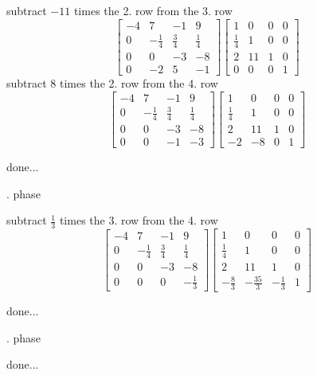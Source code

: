 \documentclass[12pt]{article}
\begin{document}
subtract $-11$ times the 2. row from the 3. row
$$\left[{\begin{array}{cccc}-4& 7& -1& 9\\ 0& -\frac{1}{4}& \frac{3}{4}& \frac{1}{4}\\ 0& 0& -3& -8\\ 0& -2& 5& -1\end{array}}\right]\left[{\begin{array}{cccc}1& 0& 0& 0\\ \frac{1}{4}& 1& 0& 0\\ 2& 11& 1& 0\\ 0& 0& 0& 1\end{array}}\right]$$
subtract $8$ times the 2. row from the 4. row
$$\left[{\begin{array}{cccc}-4& 7& -1& 9\\ 0& -\frac{1}{4}& \frac{3}{4}& \frac{1}{4}\\ 0& 0& -3& -8\\ 0& 0& -1& -3\end{array}}\right]\left[{\begin{array}{cccc}1& 0& 0& 0\\ \frac{1}{4}& 1& 0& 0\\ 2& 11& 1& 0\\ -2& -8& 0& 1\end{array}}\right]$$
\par\noindent done...


\par{}. phase

subtract $\frac{1}{3}$ times the 3. row from the 4. row
$$\left[{\begin{array}{cccc}-4& 7& -1& 9\\ 0& -\frac{1}{4}& \frac{3}{4}& \frac{1}{4}\\ 0& 0& -3& -8\\ 0& 0& 0& -\frac{1}{3}\end{array}}\right]\left[{\begin{array}{cccc}1& 0& 0& 0\\ \frac{1}{4}& 1& 0& 0\\ 2& 11& 1& 0\\ -\frac{8}{3}& -\frac{35}{3}& -\frac{1}{3}& 1\end{array}}\right]$$
\par\noindent done...


\par{}. phase

\par\noindent done...
\end{document}

